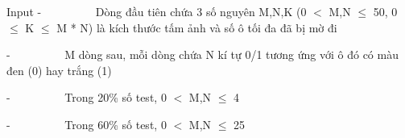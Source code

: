 Input
-          Dòng đầu tiên chứa 3 số nguyên M,N,K (0 $<$ M,N  $\le$  50, 0  $\le$  K  $\le$  M * N) là kích thước tấm ảnh và số ô tối đa đã bị mờ đi

-          M dòng sau, mỗi dòng chứa N kí tự 0/1 tương ứng với ô đó có màu đen (0) hay trắng (1)

-          Trong 20\% số test, 0 $<$ M,N  $\le$  4

-          Trong 60\% số test, 0 $<$ M,N  $\le$  25
